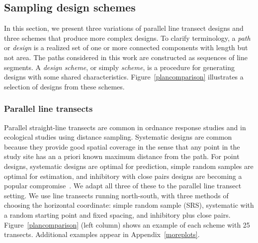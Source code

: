\documentclass[review]{elsarticle}
\begin{document}
\subsection{Sampling design schemes}
\label{methodschemes}

In this section, we present three variations of parallel line transect designs
and three schemes that produce more complex designs. To clarify terminology, a
\emph{path} or \emph{design} is a realized set of one or more connected
components with length but not area. The paths considered in this work are
constructed as sequences of line segments. A \emph{design scheme}, or simply
\emph{scheme}, is a procedure for generating designs with some shared
characteristics. Figure~\ref{plancomparison} illustrates a selection of designs
from these schemes.


\subsubsection{Parallel line transects}

Parallel straight-line transects are common in ordnance response studies and in
ecological studies using distance sampling. Systematic designs are common
because they provide good spatial coverage in the sense that any point in the
study site has an a priori known maximum distance from the path. For point
designs, systematic designs are optimal for prediction, simple random samples
are optimal for estimation, and inhibitory with close pairs designs are
becoming a popular compromise~\citep{chipetaetal2017}. We adapt all three of
these to the parallel line transect setting. We use line transects running
north-south, with three methods of choosing the horizontal coordinate: simple
random sample (SRS), systematic with a random starting point and fixed spacing,
and inhibitory plus close pairs. Figure~\ref{plancomparison} (left column)
shows an example of each scheme with 25 transects. Additional examples appear
in Appendix~\ref{moreplots}.

\end{document}
